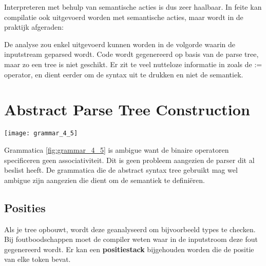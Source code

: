 Interpreteren met behulp van semantische acties is dus zeer haalbaar. In feite kan compilatie ook uitgevoerd worden met semantische acties, maar wordt in de praktijk afgeraden:
\begin{itemize}
	\alert De analyse zou enkel uitgevoerd kunnen worden in de volgorde waarin de inputstream geparsed wordt. 
	\alert Code wordt gegenereerd op basis van de parse tree, maar zo een tree is niet geschikt. Er zit te veel nutteloze informatie in zoals de := operator, en dient eerder om de syntax uit te drukken en niet de semantiek.
\end{itemize}

\section{Abstract Parse Tree Construction}
\begin{grammarfigure}[h]
	\texttt{[image: grammar\_4\_5]}
	\caption{}
	\label{fig:grammar_4_5}
\end{grammarfigure}
Grammatica \ref{fig:grammar_4_5} is ambigue want de binaire operatoren specificeren geen associativiteit. Dit is geen probleem aangezien de parser dit al beslist heeft. De grammatica die de abstract syntax tree gebruikt mag wel ambigue zijn aangezien die dient om de semantiek te definiëren.
\subsection{Posities}
Als je tree opbouwt, wordt deze geanalyseerd om bijvoorbeeld types te checken. Bij foutboodschappen moet de compiler weten waar in de inputstroom deze fout gegenereerd wordt. Er kan een \textbf{positiestack} bijgehouden worden die de positie van elke token bevat.